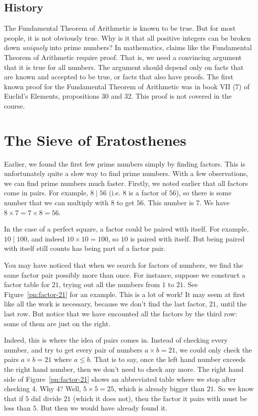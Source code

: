 \documentclass[a4paper,10pt]{report}
\begin{document}
\subsection{History}

The Fundamental Theorem of Arithmetic is known to be true. But for most people,
it is not obviously true. Why is it that all positive integers can be broken
down \emph{uniquely} into prime numbers? In mathematics, claims like the
Fundamental Theorem of Arithmetic require proof. That is, we need a convincing
argument that it is true for all numbers. The argument should depend only on
facts that are known and accepted to be true, or facts that also have proofs.
The first known proof for the Fundamental Theorem of Arithmetic was in book VII
(7) of Euclid's Elements, propositions 30 and 32. This proof is not covered in
the course.

\section{The Sieve of Eratosthenes}

Earlier, we found the first few prime numbers simply by finding factors. This
is unfortunately quite a slow way to find prime numbers. With a few
observations, we can find prime numbers much faster. Firstly, we noted earlier
that all factors come in pairs. For example, \(8 \mid 56\) (i.e. \(8\) is a
factor of \(56\)), so there is some number that we can multiply with \(8\) to
get \(56\). This number is \(7\). We have \(8 \times 7 = 7 \times 8 = 56\).

In the case of a perfect square, a factor could be paired with itself. For
example, \(10 \mid 100\), and indeed \(10 \times 10 = 100\), so \(10\) is
paired with itself. But being paired with itself still counts has being part of
a factor pair.

You may have noticed that when we search for factors of numbers, we find the
same factor pair possibly more than once. For instance, suppose we construct a
factor table for \(21\), trying out all the numbers from \(1\) to \(21\). See
Figure~\ref{pn:factor-21} for an example. This is a lot of work! It may seem at
first like all the work is necessary, because we don't find the last factor,
\(21\), until the last row. But notice that we have encounted all the factors
by the third row: some of them are just on the right.

Indeed, this is where the idea of pairs comes in. Instead of checking every
number, and try to get every pair of numbers \(a \times b = 21\), we could only
check the pairs \(a \times b = 21\) where \(a \le b\). That is to say, once the
left hand number exceeds the right hand number, then we don't need to check any
more. The right hand side of Figure~\ref{pn:factor-21} shows an abbreviated
table where we stop after checking \(4\). Why \(4\)? Well, \(5 \times 5 = 25\),
which is already bigger than \(21\). So we know that if \(5\) did divide \(21\)
(which it does not), then the factor it pairs with must be less than \(5\). But
then we would have already found it.
\end{document}
